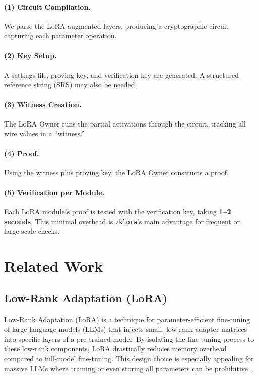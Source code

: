 \documentclass[11pt]{article}
\begin{document}
\paragraph{(1) Circuit Compilation.} 
We parse the LoRA-augmented layers, producing a cryptographic circuit capturing each parameter operation. 

\paragraph{(2) Key Setup.} 
A settings file, proving key, and verification key are generated. A structured reference string (SRS) may also be needed.

\paragraph{(3) Witness Creation.}
The LoRA Owner runs the partial activations through the circuit, tracking all wire values in a “witness.” 

\paragraph{(4) Proof.}
Using the witness plus proving key, the LoRA Owner constructs a proof. 

\paragraph{(5) Verification per Module.}
Each LoRA module’s proof is tested with the verification key, taking \textbf{1--2 seconds}. This minimal overhead is \texttt{zklora}’s main advantage for frequent or large-scale checks.

\section{Related Work}

\subsection{Low-Rank Adaptation (LoRA)}

Low-Rank Adaptation (LoRA) \cite{hu2021lora} is a technique for parameter-efficient fine-tuning of large language models (LLMs) that injects small, low-rank adapter matrices into specific layers of a pre-trained model. By isolating the fine-tuning process to these low-rank components, LoRA drastically reduces memory overhead compared to full-model fine-tuning. This design choice is especially appealing for massive LLMs where training or even storing all parameters can be prohibitive \cite{ding2022delta}.
\end{document}
